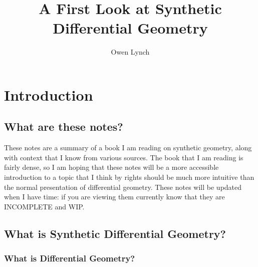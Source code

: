 \documentclass[]{book}
\title{A First Look at Synthetic Differential Geometry}
\author{Owen Lynch}
\date{}
\begin{document}
\maketitle

{
\setcounter{tocdepth}{2}
\tableofcontents
}
\hypertarget{introduction}{%
\chapter{Introduction}\label{introduction}}

\hypertarget{what-are-these-notes}{%
\section{What are these notes?}\label{what-are-these-notes}}

These notes are a summary of a book I am reading on synthetic geometry, along with context that I know from various sources. The book that I am reading is fairly dense, so I am hoping that these notes will be a more accessible introduction to a topic that I think by rights should be much more intuitive than the normal presentation of differential geometry.  These notes will be updated when I have time: if you are viewing them currently know that they are INCOMPLETE and WIP.

\hypertarget{what-is-synthetic-differential-geometry}{%
\section{What is Synthetic Differential
Geometry?}\label{what-is-synthetic-differential-geometry}}

\hypertarget{what-is-differential-geometry}{%
\subsection{What is Differential
Geometry?}\label{what-is-differential-geometry}}
\end{document}
